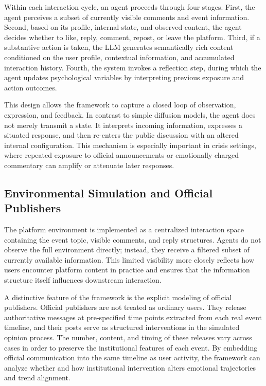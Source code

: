 \documentclass[11pt]{article}
\begin{document}
Within each interaction cycle, an agent proceeds through four stages. First, the agent perceives a subset of currently visible comments and event information. Second, based on its profile, internal state, and observed content, the agent decides whether to like, reply, comment, repost, or leave the platform. Third, if a substantive action is taken, the LLM generates semantically rich content conditioned on the user profile, contextual information, and accumulated interaction history. Fourth, the system invokes a reflection step, during which the agent updates psychological variables by interpreting previous exposure and action outcomes.

This design allows the framework to capture a closed loop of observation, expression, and feedback. In contrast to simple diffusion models, the agent does not merely transmit a state. It interprets incoming information, expresses a situated response, and then re-enters the public discussion with an altered internal configuration. This mechanism is especially important in crisis settings, where repeated exposure to official announcements or emotionally charged commentary can amplify or attenuate later responses.

\subsection{Environmental Simulation and Official Publishers}
The platform environment is implemented as a centralized interaction space containing the event topic, visible comments, and reply structures. Agents do not observe the full environment directly; instead, they receive a filtered subset of currently available information. This limited visibility more closely reflects how users encounter platform content in practice and ensures that the information structure itself influences downstream interaction.

A distinctive feature of the framework is the explicit modeling of official publishers. Official publishers are not treated as ordinary users. They release authoritative messages at pre-specified time points extracted from each real event timeline, and their posts serve as structured interventions in the simulated opinion process. The number, content, and timing of these releases vary across cases in order to preserve the institutional features of each event. By embedding official communication into the same timeline as user activity, the framework can analyze whether and how institutional intervention alters emotional trajectories and trend alignment.
\end{document}
